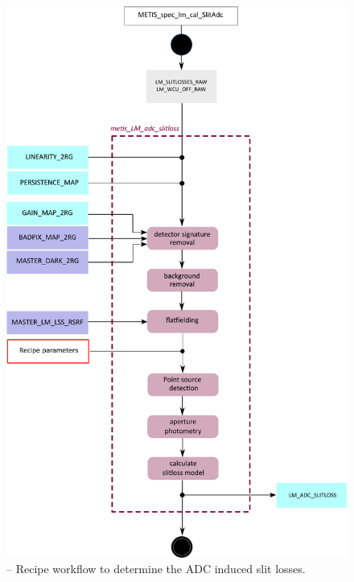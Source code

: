 \begin{figure}[ht]
  \centering
  \includegraphics[width=0.5\textheight]{figures/metis_lm_lss_adc_slitloss_v0.83.pdf}
  \caption[Recipe: ]{ --
    Recipe workflow to determine the \ac{ADC} induced slit losses.}
  \label{Fig:rec_lm_adc_slitloss}
\end{figure}

